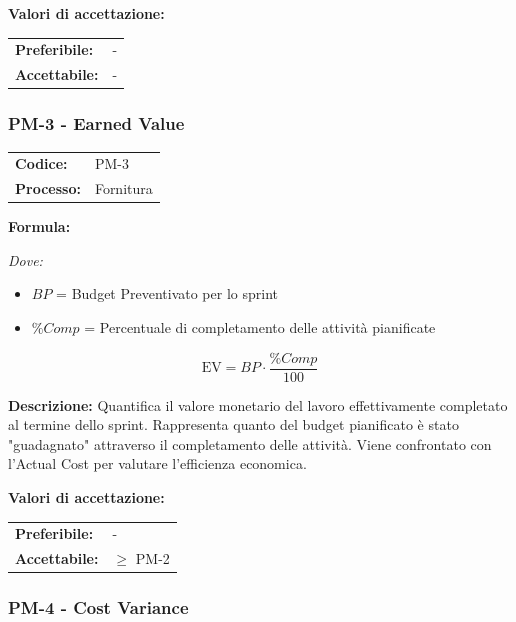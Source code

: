 \documentclass[a4paper,11pt,oneside]{scrartcl}
\begin{document}
\vspace{0.2cm}
\noindent\textbf{Valori di accettazione:}
\vspace{0.1cm}

\noindent
\begin{tabular}{@{}ll@{}}
\textbf{Preferibile:} & - \\
\textbf{Accettabile:} & - \\
\end{tabular}

\subsubsection{PM-3 - Earned Value}

\noindent
\begin{tabular}{@{}p{}p{}@{}}
\textbf{Codice:} & PM-3 \\
\textbf{Processo:} & Fornitura \\
\end{tabular}

\vspace{0.3cm}
\noindent\textbf{Formula:}

\noindent\textit{Dove:}
\begin{itemize}[leftmargin=1.5cm, topsep=0pt, itemsep=0pt]
    \item $BP$ = Budget Preventivato per lo sprint
    \item $\%Comp$ = Percentuale di completamento delle attività pianificate
\end{itemize}

\[
\text{EV} = BP \cdot \frac{\%Comp}{100}
\]

\noindent\textbf{Descrizione:} Quantifica il valore monetario del lavoro effettivamente completato al termine dello sprint. Rappresenta quanto del budget pianificato è stato "guadagnato" attraverso il completamento delle attività. Viene confrontato con l'Actual Cost per valutare l'efficienza economica.

\vspace{0.2cm}
\noindent\textbf{Valori di accettazione:}
\vspace{0.1cm}

\noindent
\begin{tabular}{@{}ll@{}}
\textbf{Preferibile:} & - \\
\textbf{Accettabile:} & $\geq$ PM-2 \\
\end{tabular}

\subsubsection{PM-4 - Cost Variance}
\end{document}
